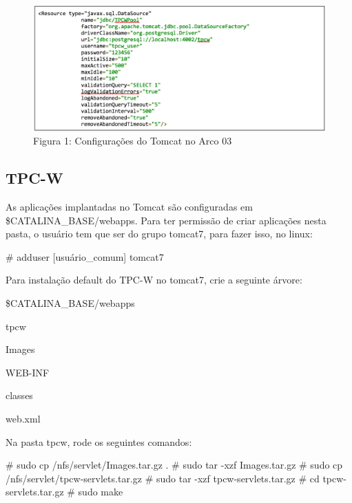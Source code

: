 \documentclass[a4paper,10pt]{article}
\begin{document}
        \begin{center}
        \begin{figure}
            \centering
          \includegraphics[width=14cm,keepaspectratio=true]{imagens/config_tomcat.png}
	        	        Figura 1: Configurações do Tomcat no Arco 03
        \end{figure}
	\end{center}
        
        \subsection{TPC-W}

        As aplicações implantadas no Tomcat são configuradas em \$CATALINA\_BASE/webapps. Para ter permissão de criar aplicações nesta pasta, o usuário tem que ser do grupo tomcat7, para fazer isso, no linux:

        \begin{spverbatim}
        # adduser [usuário_comum] tomcat7
        \end{spverbatim}

        Para instalação default do TPC-W no tomcat7, crie a seguinte árvore:
        \begin{spverbatim}

            \$CATALINA_BASE/webapps

                tpcw

                     Images

                     WEB-INF

                        classes

                        web.xml


        \end{spverbatim}

        Na pasta tpcw, rode os seguintes comandos:
        \begin{spverbatim}
            # sudo cp /nfs/servlet/Images.tar.gz .
            # sudo tar -xzf Images.tar.gz
            # sudo cp /nfs/servlet/tpcw-servlets.tar.gz
            # sudo tar -xzf tpcw-servlets.tar.gz
            # cd tpcw-servlets.tar.gz
            # sudo make
        \end{spverbatim}
\end{document}
